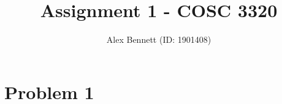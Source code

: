 \documentclass[11pt]{article}
\title{Assignment 1 - COSC 3320}
\author{Alex Bennett (ID: 1901408)}
\date{}
\begin{document}
\maketitle

\section*{Problem 1}
\end{document}
